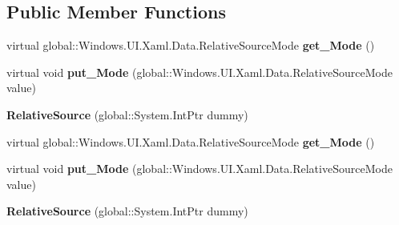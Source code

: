 \subsection*{Public Member Functions}
\begin{DoxyCompactItemize}
\item 
\mbox{\label{class_windows_1_1_u_i_1_1_xaml_1_1_data_1_1_relative_source_abc7acda53d33c1b4b39153909fa1e745}} 
virtual global\+::\+Windows.\+U\+I.\+Xaml.\+Data.\+Relative\+Source\+Mode {\bfseries get\+\_\+\+Mode} ()
\item 
\mbox{\label{class_windows_1_1_u_i_1_1_xaml_1_1_data_1_1_relative_source_a83c13d6ab8d1870d38248711c1c204e3}} 
virtual void {\bfseries put\+\_\+\+Mode} (global\+::\+Windows.\+U\+I.\+Xaml.\+Data.\+Relative\+Source\+Mode value)
\item 
\mbox{\label{class_windows_1_1_u_i_1_1_xaml_1_1_data_1_1_relative_source_a69d6d4e509b7729188061fa485d9bbbe}} 
{\bfseries Relative\+Source} (global\+::\+System.\+Int\+Ptr dummy)
\item 
\mbox{\label{class_windows_1_1_u_i_1_1_xaml_1_1_data_1_1_relative_source_abc7acda53d33c1b4b39153909fa1e745}} 
virtual global\+::\+Windows.\+U\+I.\+Xaml.\+Data.\+Relative\+Source\+Mode {\bfseries get\+\_\+\+Mode} ()
\item 
\mbox{\label{class_windows_1_1_u_i_1_1_xaml_1_1_data_1_1_relative_source_a83c13d6ab8d1870d38248711c1c204e3}} 
virtual void {\bfseries put\+\_\+\+Mode} (global\+::\+Windows.\+U\+I.\+Xaml.\+Data.\+Relative\+Source\+Mode value)
\item 
\mbox{\label{class_windows_1_1_u_i_1_1_xaml_1_1_data_1_1_relative_source_a69d6d4e509b7729188061fa485d9bbbe}} 
{\bfseries Relative\+Source} (global\+::\+System.\+Int\+Ptr dummy)
\item 
\mbox{\label{class_windows_1_1_u_i_1_1_xaml_1_1_data_1_1_relative_source_abc7acda53d33c1b4b39153909fa1e745}} 

\end{DoxyCompactItemize}
